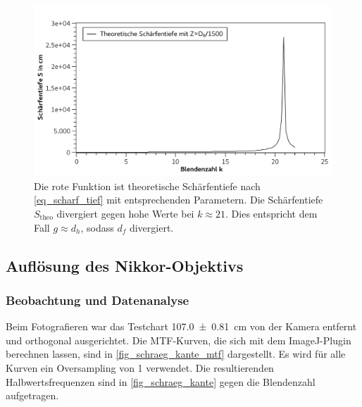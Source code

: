 \documentclass[
	a4paper,
	12pt,
	pagesize,
	ngerman
]{scrartcl}
\begin{document}
	\begin{figure}[H]  %
		\includegraphics[width=1\textwidth]{fig_scharf_tief_theo}
		\centering
		\caption{
			Die rote Funktion ist theoretische Schärfentiefe nach \cref{eq_scharf_tief} mit entsprechenden Parametern.
			Die Schärfentiefe $S_\text{theo}$ divergiert gegen hohe Werte bei $k\approx21$.
			Dies entspricht dem Fall $g\approx d_h$, sodass $d_f$ divergiert.
			}
		\label{fig_scharf_tief_theo}
		\centering
	\end{figure}



	\subsection{Auflösung des Nikkor-Objektivs}
	\subsubsection{Beobachtung und Datenanalyse}
	
	Beim Fotografieren war das Testchart \SI{107,0+-0,81}{cm} von der Kamera entfernt und orthogonal ausgerichtet.
	Die MTF-Kurven, die sich mit dem ImageJ-Plugin berechnen lassen, sind in \cref{fig_schraeg_kante_mtf} dargestellt. 
	Es wird für alle Kurven ein Oversampling von 1 verwendet.
	Die resultierenden Halbwertsfrequenzen sind in \cref{fig_schraeg_kante} gegen die Blendenzahl aufgetragen.
\end{document}
